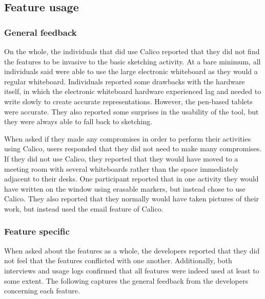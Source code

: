 \subsection{Feature usage}
\label{chapter:evaluation:deployment1:part1}

\subsubsection{General feedback}

On the whole, the individuals that did use Calico reported that they did not find the features to be invasive to the basic sketching activity. At a bare minimum, all individuals said were able to use the large electronic whiteboard as they would a regular whiteboard. Individuals reported some drawbacks with the hardware itself, in which the electronic whiteboard hardware experienced lag and needed to write slowly to create accurate representations. However, the pen-based tablets were accurate. They also reported some surprises in the usability of the tool, but they were always able to fall back to sketching.

When asked if they made any compromises in order to perform their activities using Calico, users responded that they did not need to make many compromises. If they did not use Calico, they reported that they would have moved to a meeting room with several whiteboards rather than the space immediately adjacent to their desks. One participant reported that in one activity they would have written on the window using erasable markers, but instead chose to use Calico. They also reported that they normally would have taken pictures of their work, but instead used the email feature of Calico.

\subsubsection{Feature specific}

When asked about the features as a whole, the developers reported that they did not feel that the features conflicted with one another. Additionally, both interviews and usage logs confirmed that all features were indeed used at least to some extent. The following captures the general feedback from the developers concerning each feature.

